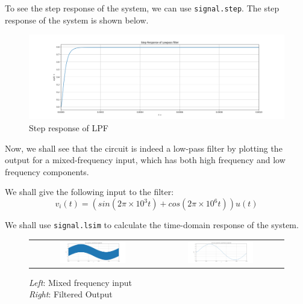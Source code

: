 \documentclass[11pt, a4paper, twoside]{article}
\begin{document}
    To see the step response of the system, we can use \texttt{signal.step}. The step response of the system is shown below.
    \begin{figure}[H]
        \centering
        \includegraphics[scale=0.4]{plots/Fig 2.png}
        \caption{Step response of LPF}
        \label{fig:Fig3}
    \end{figure}
    
    Now, we shall see that the circuit is indeed a low-pass filter by plotting the output for a mixed-frequency input, which has both high frequency and low frequency components.
    
    We shall give the following input to the filter:
    \begin{equation}
        v_i(t) = (sin(2\pi\times 10^3t)+cos(2\pi\times 10^6t))u(t)
        \label{eq4}
    \end{equation}
    
    We shall use \texttt{signal.lsim} to calculate the time-domain response of the system.
    
    \begin{figure}[H]
        \centering
        \setlength\tabcolsep{1pt}
        \begin{tabular}{cc}
            \includegraphics[width=0.55\textwidth]{plots/Fig 3.png} &
            \includegraphics[width=0.55\textwidth]{plots/Fig 4.png}\\
        \end{tabular}
        \caption{\textit{Left}: Mixed frequency input\\\textit{Right}: Filtered Output}
    \end{figure}
    
\end{document}
